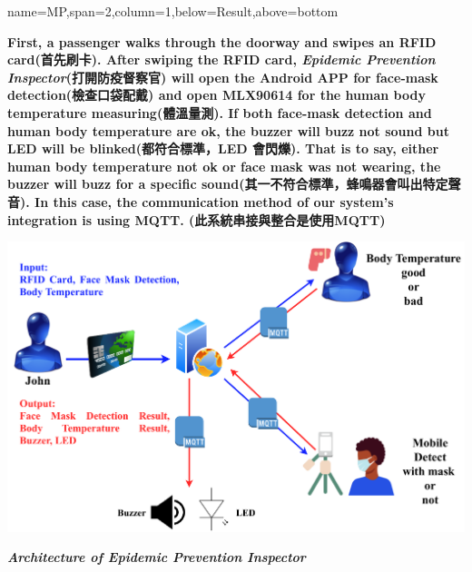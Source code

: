 \documentclass[a0paper,portrait]{baposter}
\begin{document}
\begin{CJK*}{UTF8}{bsmi}
\begin{poster}
{name=MP,span=2,column=1,below=Result,above=bottom}{
\textbf{First, a passenger walks through the doorway and swipes an RFID card(首先刷卡). After swiping the RFID card, \textit{Epidemic Prevention Inspector}(打開防疫督察官) will open the Android APP for face-mask detection(檢查口袋配戴) and open MLX90614 for the human body temperature measuring(體溫量測). If both face-mask detection and human body temperature are ok, the buzzer will buzz not sound but LED will be blinked(都符合標準，LED 會閃爍). That is to say,  either human body temperature not ok or face mask was not wearing, the buzzer will buzz for a specific sound(其一不符合標準，蜂鳴器會叫出特定聲音). In this case, the communication method of our system's integration is using MQTT. (此系統串接與整合是使用MQTT)} \\
\begin{center}
    \includegraphics[scale=0.6]{FlowChart.pdf} \\
\end{center}
\begin{center}
    \textbf{\textit{Architecture of Epidemic Prevention Inspector}}
\end{center}
}

\end{poster}
\end{CJK*}
\end{document}
